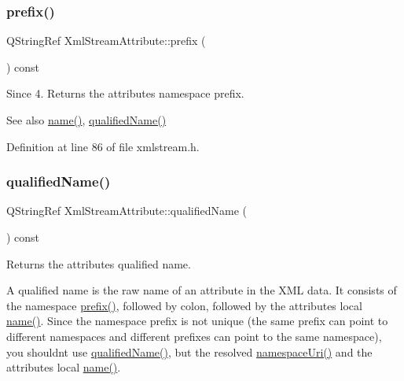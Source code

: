 \mbox{\label{class_xml_stream_attribute_a09aa6449118ecdcdbba90cc0b05f9e33}} 
\subsubsection{\texorpdfstring{prefix()}{prefix()}}
{\footnotesize\ttfamily Q\+String\+Ref Xml\+Stream\+Attribute\+::prefix (\begin{DoxyParamCaption}{ }\end{DoxyParamCaption}) const\hspace{0.3cm}{\ttfamily [inline]}}

\begin{DoxySince}{Since}
4. Returns the attribute\textquotesingle{}s namespace prefix.
\end{DoxySince}
\begin{DoxySeeAlso}{See also}
\hyperlink{class_xml_stream_attribute_a2053ea2d13de7262dac760788ed8265f}{name()}, \hyperlink{class_xml_stream_attribute_acc21c4ce8b0539d6c1131ab789171dd9}{qualified\+Name()} 
\end{DoxySeeAlso}


Definition at line 86 of file xmlstream.\+h.

\mbox{\label{class_xml_stream_attribute_acc21c4ce8b0539d6c1131ab789171dd9}} 
\subsubsection{\texorpdfstring{qualified\+Name()}{qualifiedName()}}
{\footnotesize\ttfamily Q\+String\+Ref Xml\+Stream\+Attribute\+::qualified\+Name (\begin{DoxyParamCaption}{ }\end{DoxyParamCaption}) const\hspace{0.3cm}{\ttfamily [inline]}}

Returns the attribute\textquotesingle{}s qualified name.

A qualified name is the raw name of an attribute in the X\+ML data. It consists of the namespace \hyperlink{class_xml_stream_attribute_a09aa6449118ecdcdbba90cc0b05f9e33}{prefix()}, followed by colon, followed by the attribute\textquotesingle{}s local \hyperlink{class_xml_stream_attribute_a2053ea2d13de7262dac760788ed8265f}{name()}. Since the namespace prefix is not unique (the same prefix can point to different namespaces and different prefixes can point to the same namespace), you shouldn\textquotesingle{}t use \hyperlink{class_xml_stream_attribute_acc21c4ce8b0539d6c1131ab789171dd9}{qualified\+Name()}, but the resolved \hyperlink{class_xml_stream_attribute_adf6da78e3783c50df9ce1d950e0b94c8}{namespace\+Uri()} and the attribute\textquotesingle{}s local \hyperlink{class_xml_stream_attribute_a2053ea2d13de7262dac760788ed8265f}{name()}. 

